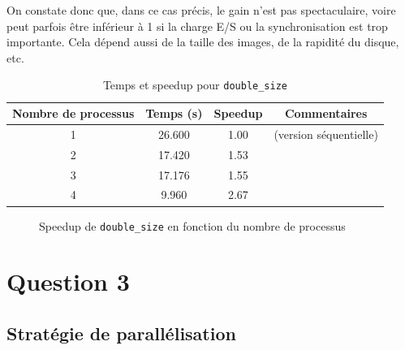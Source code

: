 \documentclass[a4paper,13pt]{book}
\begin{document}
On constate donc que, dans ce cas précis, le gain n’est pas spectaculaire, voire peut parfois être inférieur à 1 si la charge E/S ou la synchronisation est trop importante. Cela dépend aussi de la taille des images, de la rapidité du disque, etc.
\begin{table}[h!]
    \centering
    \caption{Temps et speedup pour \texttt{double\_size}}
    \label{tab:double_size}
    \begin{tabular}{@{}cccc@{}}
    \toprule
    \textbf{Nombre de processus} & \textbf{Temps (s)} & \textbf{Speedup} & \textbf{Commentaires}\\
    \midrule
    1 & 26.600 & 1.00 & (version séquentielle)\\
    2 & 17.420 & 1.53 & \\
    3 & 17.176 & 1.55 & \\
    4 & 9.960  & 2.67 & \\
    \bottomrule
    \end{tabular}
    \end{table}
    \begin{figure}[h!]
        \centering
        \caption{Speedup de \texttt{double\_size} en fonction du nombre de processus}
        \label{fig:double_size_speedup}
        \end{figure}

\section{Question 3}
\subsection{Stratégie de parallélisation}
\end{document}
